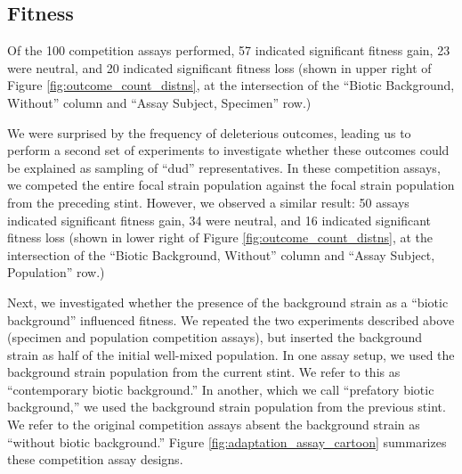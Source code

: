 
\subsection{Fitness}

% 



Of the 100 competition assays performed, 57 indicated significant fitness gain, 23 were neutral, and 20 indicated significant fitness loss (shown in upper right of Figure \ref{fig:outcome_count_distns}, at the intersection of the ``Biotic Background, Without'' column and ``Assay Subject, Specimen'' row.)

We were surprised by the frequency of deleterious outcomes, leading us to perform a second set of experiments to investigate whether these outcomes could be explained as sampling of ``dud'' representatives.
In these competition assays, we competed the entire focal strain population against the focal strain population from the preceding stint.
However, we observed a similar result: 50 assays indicated significant fitness gain, 34 were neutral, and 16 indicated significant fitness loss (shown in lower right of Figure \ref{fig:outcome_count_distns}, at the intersection of the ``Biotic Background, Without'' column and ``Assay Subject, Population'' row.)



Next, we investigated whether the presence of the background strain as a ``biotic background'' influenced fitness.
We repeated the two experiments described above (specimen and population competition assays), but inserted the background strain as half of the initial well-mixed population.
In one assay setup, we used the background strain population from the current stint.
We refer to this as ``contemporary biotic background.''
In another, which we call ``prefatory biotic background,'' we used the background strain population from the previous stint.
We refer to the original competition assays absent the background strain as ``without biotic background.''
Figure \ref{fig:adaptation_assay_cartoon} summarizes these competition assay designs.

